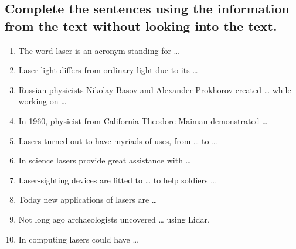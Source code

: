 \documentclass[12pt, a4paper]{report}
\begin{document}
\subsection*{Complete the sentences using the information from the text without
    looking into the text.}
\begin{enumerate}
    \item The word laser is an acronym standing for …
    \item Laser light differs from ordinary light due to its …
    \item Russian physicists Nikolay Basov and Alexander Prokhorov created … while
          working on …
    \item In 1960, physicist from California Theodore Maiman demonstrated …
    \item Lasers turned out to have myriads of uses, from … to …
    \item In science lasers provide great assistance with …
    \item Laser-sighting devices are fitted to … to help soldiers …
    \item Today new applications of lasers are …
    \item Not long ago archaeologists uncovered … using Lidar.
    \item In computing lasers could have …
\end{enumerate}
\end{document}
